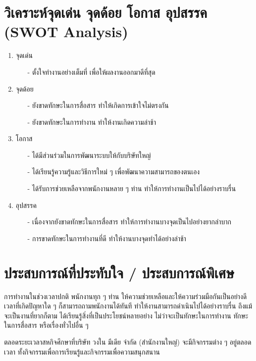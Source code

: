 \section{วิเคราะห์จุดเด่น จุดด้อย โอกาส อุปสรรค (SWOT Analysis)}
\begin{enumerate}
	\item จุดเด่น
	\begin{itemize}
		\item[-] ตั้งใจทำงานอย่างเต็มที่ เพื่อให้ผลงานออกมาดีที่สุด
	\end{itemize}
	\item จุดด้อย
	\begin{itemize}
		\item[-] ยังขาดทักษะในการสื่อสาร ทำให้เกิดการเข้าใจไม่ตรงกัน
		\item[-] ยังขาดทักษะในการทำงาน ทำให้งานเกิดความล่าช้า
	\end{itemize}
	\item โอกาส
	\begin{itemize}
		\item[-] ได้มีส่วนร่วมในการพัฒนาระบบให้กับบริษัทใหญ่
		\item[-] ได้เรียนรู้ความรู้และวิธีการใหม่ ๆ เพื่อพัฒนาความสามารถของตนเอง
		\item[-] ได้รับการช่วยเหลือจากพนักงานหลาย ๆ ท่าน ทำให้การทำงานเป็นไปได้อย่างราบรื่น
	\end{itemize}
	\item อุปสรรค
	\begin{itemize}
		\item[-] เนื่องจากยังขาดทักษะในการสื่อสาร ทำให้การทำงานบางจุดเป็นไปอย่างยากลำบาก
		\item[-] การขาดทักษะในการทำงานที่ดี ทำให้งานบางจุดทำได้อย่างล่าช้า
	\end{itemize}
\end{enumerate}

\section{ประสบการณ์ที่ประทับใจ / ประสบการณ์พิเศษ}
การทำงานในช่วงเวลาปกติ พนักงานทุก ๆ ท่าน ให้ความช่วยเหลือและให้ความร่วมมือกันเป็นอย่างดีเวลาที่เกิดปัญหาใด ๆ ก็สามารถถามพนักงานได้ทันที ทำให้งานสามารถดำเนินไปได้อย่างราบรื่น ถึงแม้จะเป็นงานที่ยากก็ตาม ได้เรียนรู้สิ่งที่เป็นประโยชน์หลายอย่าง ไม่ว่าจะเป็นทักษะในการทำงาน ทักษะในการสื่อสาร หรือเรื่องทั่วไปอื่น ๆ

ตลอดระยะเวลาสหกิจศึกษาที่บริษัท วงใน มีเดีย จำกัด (สำนักงานใหญ่) จะมีกิจกรรมต่าง ๆ อยู่ตลอดเวลา ทั้งกิจกรรมเพื่อการเรียนรู้และกิจกรรมเพื่อความสนุกสนาน
